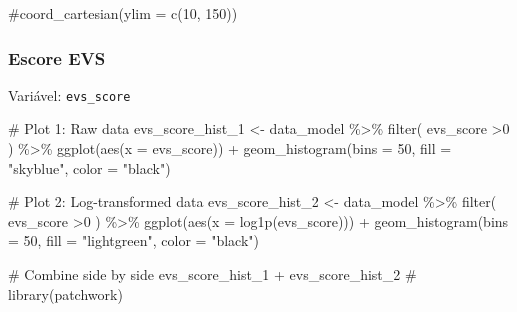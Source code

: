\documentclass[
  12pt,
]{article}
\newenvironment{Shaded}{\begin{snugshade}}{\end{snugshade}}
\newcommand{\AttributeTok}[1]{\textcolor[rgb]{0.40,0.45,0.13}{#1}}
\newcommand{\CommentTok}[1]{\textcolor[rgb]{0.37,0.37,0.37}{#1}}
\newcommand{\DecValTok}[1]{\textcolor[rgb]{0.68,0.00,0.00}{#1}}
\newcommand{\FunctionTok}[1]{\textcolor[rgb]{0.28,0.35,0.67}{#1}}
\newcommand{\NormalTok}[1]{\textcolor[rgb]{0.00,0.23,0.31}{#1}}
\newcommand{\OtherTok}[1]{\textcolor[rgb]{0.00,0.23,0.31}{#1}}
\newcommand{\SpecialCharTok}[1]{\textcolor[rgb]{0.37,0.37,0.37}{#1}}
\newcommand{\StringTok}[1]{\textcolor[rgb]{0.13,0.47,0.30}{#1}}
\begin{document}
\begin{Shaded}
\begin{Highlighting}[]
    \CommentTok{\#coord\_cartesian(ylim = c(10, 150))}
\end{Highlighting}
\end{Shaded}

\subsubsection{Escore EVS}\label{escore-evs}

Variável: \texttt{evs\_score}

\begin{Shaded}
\begin{Highlighting}[]
\CommentTok{\# Plot 1: Raw data}
\NormalTok{evs\_score\_hist\_1 }\OtherTok{\textless{}{-}}\NormalTok{ data\_model }\SpecialCharTok{\%\textgreater{}\%} 
    \FunctionTok{filter}\NormalTok{(}
\NormalTok{        evs\_score }\SpecialCharTok{\textgreater{}}\DecValTok{0}
\NormalTok{    ) }\SpecialCharTok{\%\textgreater{}\%} 
    \FunctionTok{ggplot}\NormalTok{(}\FunctionTok{aes}\NormalTok{(}\AttributeTok{x =}\NormalTok{ evs\_score)) }\SpecialCharTok{+} 
    \FunctionTok{geom\_histogram}\NormalTok{(}\AttributeTok{bins =} \DecValTok{50}\NormalTok{, }\AttributeTok{fill =} \StringTok{"skyblue"}\NormalTok{, }\AttributeTok{color =} \StringTok{"black"}\NormalTok{)}

\CommentTok{\# Plot 2: Log{-}transformed data}
\NormalTok{evs\_score\_hist\_2 }\OtherTok{\textless{}{-}}\NormalTok{ data\_model }\SpecialCharTok{\%\textgreater{}\%} 
     \FunctionTok{filter}\NormalTok{(}
\NormalTok{        evs\_score }\SpecialCharTok{\textgreater{}}\DecValTok{0}
\NormalTok{    ) }\SpecialCharTok{\%\textgreater{}\%} 
    \FunctionTok{ggplot}\NormalTok{(}\FunctionTok{aes}\NormalTok{(}\AttributeTok{x =} \FunctionTok{log1p}\NormalTok{(evs\_score))) }\SpecialCharTok{+} 
    \FunctionTok{geom\_histogram}\NormalTok{(}\AttributeTok{bins =} \DecValTok{50}\NormalTok{, }\AttributeTok{fill =} \StringTok{"lightgreen"}\NormalTok{, }\AttributeTok{color =} \StringTok{"black"}\NormalTok{)}

\CommentTok{\# Combine side by side}
\NormalTok{evs\_score\_hist\_1 }\SpecialCharTok{+}\NormalTok{ evs\_score\_hist\_2 }\CommentTok{\# library(patchwork)}
\end{Highlighting}
\end{Shaded}
\end{document}
